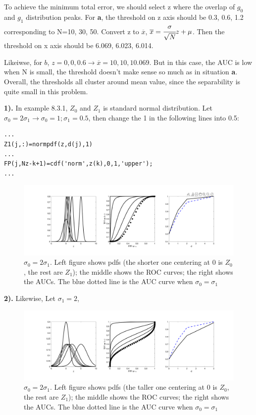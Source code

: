 \documentclass[12pt,a4paper]{article}
\begin{document}
To achieve the minimum total error, we should select z where the overlap of $g_0$ and $g_1$ distribution peaks. For \textbf{a}, the threshold on z axis should be 0.3, 0.6, 1.2 corresponding to N=10, 30, 50. Convert z to $\overline x$, $\overline x=\cfrac{\sigma}{\sqrt{N}}z+\mu$. Then the threshold on x axis should be 6.069, 6.023, 6.014.

Likeiwse, for $b$, $z=0,0,0.6\rightarrow \overline x=10,10,10.069$. But in this case, the AUC is low when N is small, the threshold doesn't make sense so much as in situation \textbf{a}.
Overall, the thresholds all cluster around mean value, since the separability is quite small in this problem. 

\newpage
{}
\textbf{1).} In example 8.3.1, $Z_0$ and $Z_1$ is standard normal distribution. Let $\sigma_0=2\sigma_1 \rightarrow \sigma_0=1;\sigma_1=0.5$, then change the 1 in the following lines into 0.5:
\begin{lstlisting}
...
Z1(j,:)=normpdf(z,d(j),1)
...
FP(j,Nz-k+1)=cdf('norm',z(k),0,1,'upper');
...
\end{lstlisting}  

\begin{figure}[!ht]
\centering
\includegraphics*[width=\textwidth]{hw_8_4_a.png}
\caption{$\sigma_0=2\sigma_1$. Left figure shows pdfs (the shorter one centering at 0 is $Z_0$, the rest are $Z_1$); the middle shows the ROC curves; the right shows the AUCs. The blue dotted line is the AUC curve when $\sigma_0=\sigma_1$}
\end{figure}

\textbf{2).} Likewise, Let $\sigma_1=2$,
\begin{figure}[!ht]
    \centering
    \includegraphics*[width=\textwidth]{hw_8_4_b.png}
    \caption{$\sigma_0=2\sigma_1$. Left figure shows pdfs (the taller one centering at 0 is $Z_0$, the rest are $Z_1$); the middle shows the ROC curves; the right shows the AUCs. The blue dotted line is the AUC curve when $\sigma_0=\sigma_1$}
\end{figure}
\end{document}
